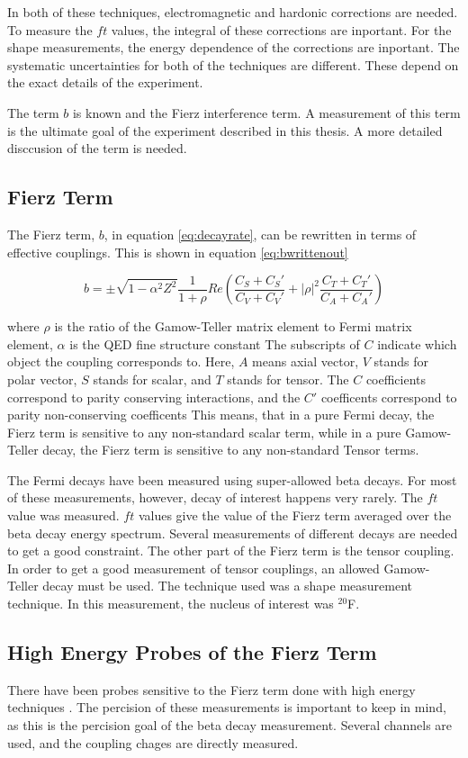 \documentclass[main.tex]{subfiles}
\begin{document}
In both of these techniques, electromagnetic and hardonic corrections are needed.
To measure the $ft$ values, the integral of these corrections are inportant.
For the shape measurements, the energy dependence of the corrections are inportant.
The systematic uncertainties for both of the techniques are different.
These depend on the exact details of the experiment.

The term $b$ is known and the Fierz interference term.
A measurement of this term is the ultimate goal of the experiment described in this thesis.
A more detailed disccusion of the term is needed.

\subsection{Fierz Term}
The Fierz term, $b$, in equation \ref{eq:decayrate}, can be rewritten in terms of effective couplings.
This is shown in equation \ref{eq:bwrittenout}

\begin{equation}
	b =  \pm \sqrt{1 - \alpha^{2}{Z^{2}}}\frac{1}{1 + \rho}Re(\frac{C_{S} + C_{S}'}{C_{V} + C_{V}'} + |\rho|^{2}\frac{C_{T} + C_{T}'}{C_{A} + C_{A}'})
	\label{eq:bwrittenout}
\end{equation}

where $\rho$ is the ratio of the Gamow-Teller matrix element to Fermi matrix element, $\alpha$ is the QED fine structure constant \cite{Gon19}
The subscripts of $C$ indicate which object the coupling corresponds to. 
Here, $A$ means axial vector, $V$ stands for polar vector, $S$ stands for scalar, and $T$ stands for tensor. 
The $C$ coefficients correspond to parity conserving interactions, and the $C'$ coefficents correspond to parity non-conserving coefficents \cite{Lee56}
This means, that in a pure Fermi decay, the Fierz term is sensitive to any non-standard scalar term, while in a pure Gamow-Teller decay, the Fierz term is sensitive to any non-standard Tensor terms. 

The Fermi decays have been measured using super-allowed beta decays.
For most of these measurements, however, decay of interest happens very rarely.
The $ft$ value was measured.
$ft$ values give the value of the Fierz term averaged over the beta decay energy spectrum.
Several measurements of different decays are needed to get a good constraint.
The other part of the Fierz term is the tensor coupling. 
In order to get a good measurement of  tensor couplings, an allowed Gamow-Teller decay must be used. 
The technique used was a shape measurement technique.
In this measurement, the nucleus of interest was $^{20}$F.

\subsection{High Energy Probes of the Fierz Term}

There have been probes sensitive to the Fierz term done with high energy techniques \cite{Gon19}.
The percision of these measurements is important to keep in mind, as this is the percision goal of the beta decay measurement.
Several channels are used, and the coupling chages are directly measured.
\end{document}
